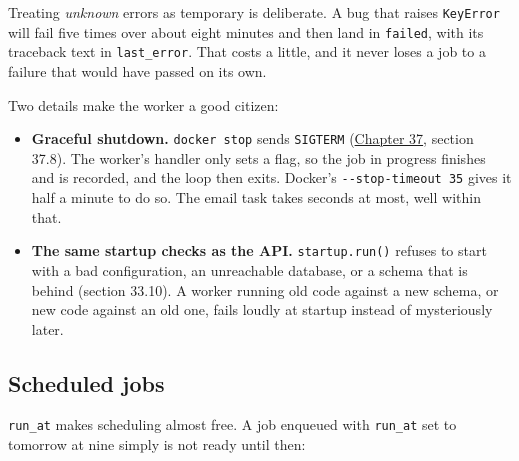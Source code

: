 Treating \emph{unknown} errors as temporary is deliberate. A bug that raises \texttt{KeyError} will fail five times over about eight minutes and then land in \texttt{failed}, with its traceback text in \texttt{last\_error}. That costs a little, and it never loses a job to a failure that would have passed on its own.

Two details make the worker a good citizen:

\begin{itemize}
\tightlist
\item
  \textbf{Graceful shutdown.} \texttt{docker\ stop} sends \texttt{SIGTERM} (\hyperref[ch:37-reliability]{Chapter 37}, section 37.8). The worker's handler only sets a flag, so the job in progress finishes and is recorded, and the loop then exits. Docker's \texttt{-\/-stop-timeout\ 35} gives it half a minute to do so. The email task takes seconds at most, well within that.
\item
  \textbf{The same startup checks as the API.} \texttt{startup.run()} refuses to start with a bad configuration, an unreachable database, or a schema that is behind (section 33.10). A worker running old code against a new schema, or new code against an old one, fails loudly at startup instead of mysteriously later.
\end{itemize}

\subsection*{Scheduled jobs}\label{41-event-driven-architecture:scheduled-jobs}

\texttt{run\_at} makes scheduling almost free. A job enqueued with \texttt{run\_at} set to tomorrow at nine simply is not ready until then:

\begin{codebox}[short]

\begin{Shaded}
\begin{Highlighting}[]
\OperatorTok{=}\NormalTok{, }\NormalTok{, }\NormalTok{, }\NormalTok{, }\OperatorTok{=}
\OperatorTok{=}
\end{Highlighting}
\end{Shaded}

\end{codebox}

